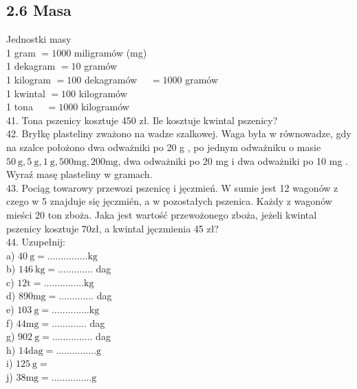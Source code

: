 \documentclass[10pt]{article}
\begin{document}
\subsection*{2.6 Masa}
Jednostki masy\\
1 gram \(=1000\) miligramów (mg)\\
1 dekagram \(=10\) gramów\\
1 kilogram \(=100\) dekagramów \(\quad=1000\) gramów\\
1 kwintal \(=100\) kilogramów\\
1 tona \(\quad=1000\) kilogramów\\
41. Tona pszenicy kosztuje 450 zł. Ile kosztuje kwintal pszenicy?\\
42. Bryłkę plasteliny zważono na wadze szalkowej. Waga była w równowadze, gdy na szalce położono dwa odważniki po 20 g , po jednym odważniku o masie \(50 \mathrm{~g}, 5 \mathrm{~g}, 1 \mathrm{~g}, 500 \mathrm{mg}, 200 \mathrm{mg}\), dwa odważniki po 20 mg i dwa odważniki po 10 mg . Wyraź masę plasteliny w gramach.\\
43. Pociąg towarowy przewozi pszenicę i jęczmień. W sumie jest 12 wagonów z czego w 5 znajduje się jęczmién, a w pozostałych pszenica. Każdy z wagonów mieści 20 ton zboża. Jaka jest wartość przewożonego zboża, jeżeli kwintal pszenicy kosztuje \(70 \mathrm{zł}\), a kwintal jęczmienia 45 zł?\\
44. Uzupełnij:\\
a) \(40 \mathrm{~g}=\ldots \ldots \ldots \ldots \ldots \mathrm{kg}\)\\
b) \(146 \mathrm{~kg}=\ldots \ldots \ldots \ldots\). dag\\
c) \(12 \mathrm{t}=\ldots \ldots \ldots \ldots \ldots \mathrm{kg}\)\\
d) \(890 \mathrm{mg}=\ldots \ldots \ldots \ldots\). dag\\
e) \(103 \mathrm{~g}=\ldots \ldots \ldots \ldots . . \mathrm{kg}\)\\
f) \(44 \mathrm{mg}=\ldots \ldots \ldots \ldots\). dag\\
g) \(902 \mathrm{~g}=\ldots \ldots \ldots \ldots \ldots\) dag\\
h) \(14 \mathrm{dag}=\ldots \ldots \ldots \ldots \ldots \mathrm{g}\)\\
i) \(125 \mathrm{~g}=\)\\
j) \(38 \mathrm{mg}=\ldots \ldots \ldots \ldots \ldots \mathrm{g}\)
\end{document}
